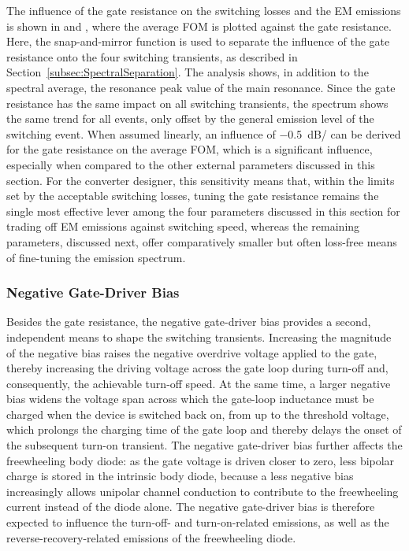 The influence of the gate resistance on the switching losses and the EM emissions is shown in  and , where the average FOM is plotted against the gate resistance.
Here, the snap-and-mirror function is used to separate the influence of the gate resistance onto the four switching transients, as described in Section~\ref{subsec:SpectralSeparation}.
The analysis shows, in addition to the spectral average, the resonance peak value of the main resonance.
Since the gate resistance has the same impact on all switching transients, the spectrum shows the same trend for all events, only offset by the general emission level of the switching event.
When assumed linearly, an influence of \SI{-0.5}{dB/\Omega} can be derived for the gate resistance on the average FOM, which is a significant influence, especially when compared to the other external parameters discussed in this section.
For the converter designer, this sensitivity means that, within the limits set by the acceptable switching losses, tuning the gate resistance remains the single most effective lever among the four parameters discussed in this section for trading off EM emissions against switching speed, whereas the remaining parameters, discussed next, offer comparatively smaller but often loss-free means of fine-tuning the emission spectrum.

\FloatBarrier

\subsubsection*{Negative Gate-Driver Bias}

Besides the gate resistance, the negative gate-driver bias  provides a second, independent means to shape the switching transients.
Increasing the magnitude of the negative bias raises the negative overdrive voltage applied to the gate, thereby increasing the driving voltage across the gate loop during turn-off and, consequently, the achievable turn-off speed.
At the same time, a larger negative bias widens the voltage span across which the gate-loop inductance must be charged when the device is switched back on, from  up to the threshold voltage, which prolongs the charging time of the gate loop and thereby delays the onset of the subsequent turn-on transient.
The negative gate-driver bias further affects the freewheeling body diode: as the gate voltage is driven closer to zero, less bipolar charge is stored in the intrinsic body diode, because a less negative bias increasingly allows unipolar channel conduction to contribute to the freewheeling current instead of the diode alone.
The negative gate-driver bias is therefore expected to influence the turn-off- and turn-on-related emissions, as well as the reverse-recovery-related emissions of the freewheeling diode.

